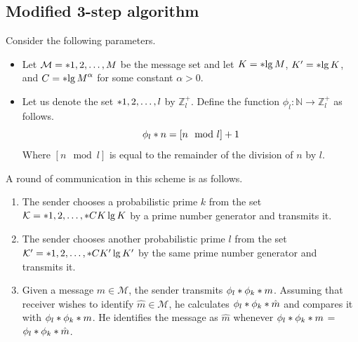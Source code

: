 \documentclass{article}
\begin{document}
\subsection{Modified 3-step algorithm}
Consider the following parameters.
\begin{itemize}
	\item Let \(\mathcal{M} = \set{1,2, \dots, M }\) be the message set and let \(K = \ceil{\lg M}\), \(K' = \ceil{\lg K}\), and \(C = \bracket{\lg M}^{\alpha}\) for some constant \(\alpha > 0\). 
	\item Let us denote the set \(\set{1,2, \dots, l }\) by \(\mathbb{Z}^+_l\).  Define the function \(\phi_l: \mathbb{N} \to \mathbb{Z}_{l}^+ \) as follows.
	\begin{equation}
		\func{\phi_l}{n}= [n \mod l] + 1
	\end{equation}
	Where \([n \mod l]\) is equal to the remainder of the division of \(n\) by \(l\).
\end{itemize}

A round of communication in this scheme is as follows.
\begin{enumerate}
	\item The sender chooses a probabilistic prime \(k\) from the set \(\mathcal{K} = \set{1,2,\dots, \ceil{C K \lg K}}\) by a prime number generator and transmits it.
	\item The sender chooses another probabilistic prime \(l\) from the set \( \mathcal{K}' = \set{1,2,\dots, \ceil{CK' \lg K'} }\) by the same prime number generator and transmits it.
	\item Given a message \(m \in \mathcal{M}\), the sender transmits \(\func{\phi_l}{\func{\phi_k}{m}}\). Assuming that receiver wishes to identify \(\hat{m} \in \mathcal{M}\), he calculates \(\func{\phi_l}{\func{\phi_k}{\hat{m}}}\) and compares it with \(\func{\phi_l}{\func{\phi_k}{m}}\). He identifies the message as \(\hat{m}\) whenever \(\func{\phi_l}{\func{\phi_k}{m}}\) = \(\func{\phi_l}{\func{\phi_k}{\hat{m}}}\).
\end{enumerate}
\end{document}
